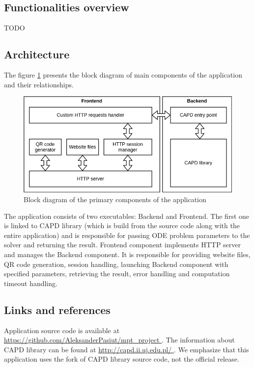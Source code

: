 \documentclass[12pt, a4paper]{article}
\begin{document}
\subsection*{Functionalities overview}
TODO

\subsection*{Architecture}
The figure \ref{fig:architecture} presents the block diagram of main components of the application and their relationships.

\begin{figure}[h]
    \includegraphics[width=\textwidth]{architecture.png}
    \caption{Block diagram of the primary components of the application}
    \label{fig:architecture}
\end{figure}

The application consists of two executables: Backend and Frontend. The first one is linked to CAPD library (which is build from the source code along with the entire application) and is responsible for passing ODE problem parameters to the solver and returning the result. Frontend component implements HTTP server and manages the Backend component. It is responsible for providing website files, QR code generation, session handling, launching Backend component with specified parameters, retrieving the result, error handling and computation timeout handling.

\subsection*{Links and references}
Application source code is available at \url{ https://github.com/AleksanderPasiut/mpt_project }. The information about CAPD library can be found at \url{ http://capd.ii.uj.edu.pl/ }. We emphasize that this application uses the fork of CAPD library source code, not the official release.
\end{document}
